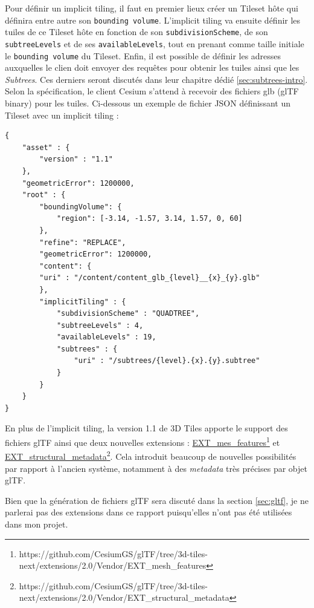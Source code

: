 Pour définir un implicit tiling, il faut en premier lieux créer un Tileset hôte qui définira entre autre son \texttt{bounding volume}. L'implicit tiling va ensuite définir les tuiles de ce Tileset hôte en fonction de son \texttt{subdivisionScheme}, de son \texttt{subtreeLevels} et de ses \texttt{availableLevels}, tout en prenant comme taille initiale le \texttt{bounding volume} du Tileset. Enfin, il est possible de définir les adresses auxquelles le clien doit envoyer des requêtes pour obtenir les tuiles ainsi que les \textit{Subtrees}. Ces derniers seront discutés dans leur chapitre dédié \autoref{sec:subtrees-intro}. Selon la spécification, le client Cesium s'attend à recevoir des fichiers glb (glTF binary) pour les tuiles. Ci-dessous un exemple de fichier JSON définissant un Tileset avec un implicit tiling :

\newpage
\begin{verbatim}
{
    "asset" : {
        "version" : "1.1"
    },
    "geometricError": 1200000,
    "root" : {
        "boundingVolume": {
            "region": [-3.14, -1.57, 3.14, 1.57, 0, 60]
        },
        "refine": "REPLACE",
        "geometricError": 1200000,
        "content": {
        "uri" : "/content/content_glb_{level}__{x}_{y}.glb"
        },
        "implicitTiling" : {
            "subdivisionScheme" : "QUADTREE",
            "subtreeLevels" : 4,
            "availableLevels" : 19,
            "subtrees" : {
                "uri" : "/subtrees/{level}.{x}.{y}.subtree"
            }
        }
    }
}
\end{verbatim}

En plus de l'implicit tiling, la version 1.1 de 3D Tiles apporte le support des fichiers glTF ainsi que deux nouvelles extensions : \href{https://github.com/CesiumGS/glTF/tree/3d-tiles-next/extensions/2.0/Vendor/EXT_mesh_features}{EXT\_mes\_features}\footnote{https://github.com/CesiumGS/glTF/tree/3d-tiles-next/extensions/2.0/Vendor/EXT\_mesh\_features} et \href{https://github.com/CesiumGS/glTF/tree/3d-tiles-next/extensions/2.0/Vendor/EXT_structural_metadata}{EXT\_structural\_metadata}\footnote{https://github.com/CesiumGS/glTF/tree/3d-tiles-next/extensions/2.0/Vendor/EXT\_structural\_metadata}. Cela introduit beaucoup de nouvelles possibilités par rapport à l'ancien système, notamment à des \textit{metadata} très précises par objet glTF.

Bien que la génération de fichiers glTF sera discuté dans la section \ref{sec:gltf}, je ne parlerai pas des extensions dans ce rapport puisqu'elles n'ont pas été utilisées dans mon projet.

